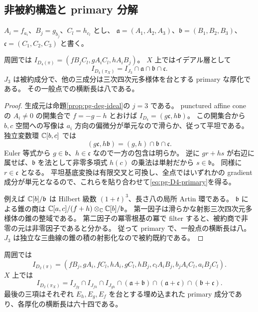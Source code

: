 \subsection{非被約構造と primary 分解}
$A_i=f_{a_i}$、$B_j=g_{b_j}$、$C_l=h_{c_l}$ とし、
$\mathfrak a=(A_1,A_2,A_3)$、$\mathfrak b=(B_1,B_2,B_3)$、$\mathfrak c=(C_1,C_2,C_3)$ と書く。
\begin{proposition}\label{prop:pg-D4-primary}
周囲では $I_{D_4(\pi)}=(fB_jC_l,gA_iC_l,hA_iB_j)$。
$X$ 上ではイデアル層として
\begin{equation}
I_{D_4(\pi_X)}=I_{J_3}\cap\mathfrak a\cap\mathfrak b\cap\mathfrak c.\label{eq:pg-D4-primary}
\end{equation}
$J_3$ は被約成分で、他の三成分は三次四次元多様体を台とする primary な厚化である。
その一般点での横断長は八である。
\end{proposition}
\begin{proof}
生成元は命題\ref{prop:pg-deg-ideal}の $j=3$ である。
punctured affine cone の $A_i\neq0$ の開集合で $f=-g-h$ とおけば
$I_{D_4}=(g\mathfrak c,h\mathfrak b)$。
この開集合から $b,c$ 空間への写像は $a_i$ 方向の偏微分が単元なので滑らか、従って平坦である。
独立変数環 $\mathbb C[b,c]$ では
\[
(g\mathfrak c,h\mathfrak b)=(g,h)\cap\mathfrak b\cap\mathfrak c.
\]
Euler 等式から $g\in\mathfrak b$、$h\in\mathfrak c$ なので一方の包含は明らか。
逆に $gr+hs$ が右辺に属せば、$\mathfrak b$ を法として非零多項式 $h(c)$ の乗法は単射だから $s\in\mathfrak b$。
同様に $r\in\mathfrak c$ となる。
平坦基底変換は有限交叉と可換し、全点ではいずれかの gradient 成分が単元となるので、これらを貼り合わせて\eqref{eq:pg-D4-primary}を得る。

例えば $\mathbb C[b]/\mathfrak b$ は Hilbert 級数 $(1+t)^3$、長さ八の局所 Artin 環である。
$\mathfrak b$ による錐の商は
$\mathbb C[a,c]/(f+h)\otimes_\mathbb C\mathbb C[b]/\mathfrak b$。
第一因子は滑らかな射影三次四次元多様体の錐の整域である。
第二因子の冪零根基の冪で filter すると、被約商で非零の元は非零因子であると分かる。
従って primary で、一般点の横断長は八。
$J_3$ は独立な三曲線の錐の積の射影化なので被約既約である。
\end{proof}
\begin{proposition}\label{prop:pg-D2-primary}
周囲では
\[
I_{D_2(\pi)}=(fB_j,gA_i,fC_l,hA_i,gC_l,hB_j,
 c_lA_iB_j,b_jA_iC_l,a_iB_jC_l).
\]
$X$ 上では
\begin{equation}
I_{D_2(\pi_X)}=I_{J_{fg}}\cap I_{J_{fh}}\cap I_{J_{gh}}
\cap(\mathfrak a+\mathfrak b)\cap(\mathfrak a+\mathfrak c)\cap(\mathfrak b+\mathfrak c).
\label{eq:pg-D2-primary}
\end{equation}
最後の三項はそれぞれ $E_h,E_g,E_f$ を台とする埋め込まれた primary 成分であり、各厚化の横断長は六十四である。
\end{proposition}
